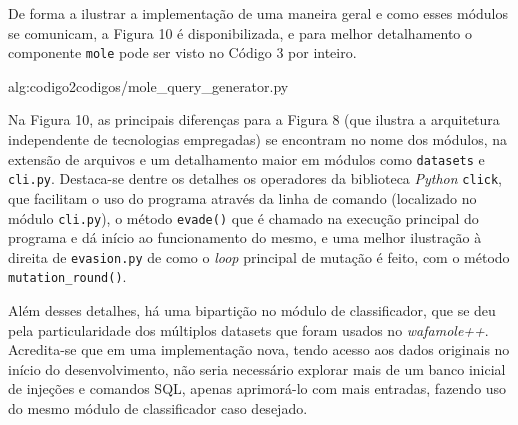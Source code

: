 De forma a ilustrar a implementação de uma maneira geral e como esses módulos se comunicam, a Figura 10 é disponibilizada, e para melhor detalhamento o componente \verb+mole+ pode ser visto no Código 3 por inteiro.

\label{sec:codigos}
 {alg:codigo2}{codigos/mole_query_generator.py}
\bigskip

Na Figura 10, as principais diferenças para a Figura 8 (que ilustra a arquitetura independente de tecnologias empregadas) se encontram no nome dos módulos, na extensão de arquivos e um detalhamento maior em módulos como \verb+datasets+ e \verb+cli.py+. Destaca-se dentre os detalhes os operadores da biblioteca \textit{Python} \verb+click+, que facilitam o uso do programa através da linha de comando (localizado no módulo \verb+cli.py+), o método \verb+evade()+ que é chamado na execução principal do programa e dá início ao funcionamento do mesmo, e uma melhor ilustração à direita de \verb+evasion.py+ de como o \textit{loop} principal de mutação é feito, com o método \verb+mutation_round()+.

Além desses detalhes, há uma bipartição no módulo de classificador, que se deu pela particularidade dos múltiplos datasets que foram usados no \textit{wafamole++}. Acredita-se que em uma implementação nova, tendo acesso aos dados originais no início do desenvolvimento, não seria necessário explorar mais de um banco inicial de injeções e comandos SQL, apenas aprimorá-lo com mais entradas, fazendo uso do mesmo módulo de classificador caso desejado.

